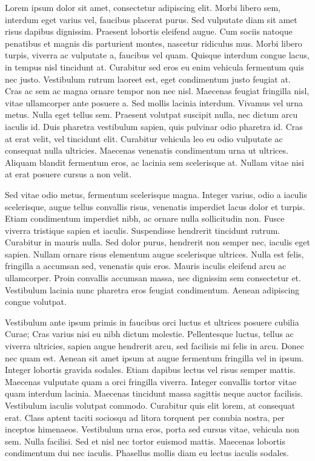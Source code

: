 \documentclass{book}
\begin{document}
Lorem ipsum dolor sit amet, consectetur adipiscing elit. Morbi libero sem,
interdum eget varius vel, faucibus placerat purus. Sed vulputate diam sit amet
risus dapibus dignissim. Praesent lobortis eleifend augue. Cum sociis natoque
penatibus et magnis dis parturient montes, nascetur ridiculus mus. Morbi libero
turpis, viverra ac vulputate a, faucibus vel quam. Quisque interdum congue
lacus, in tempus nisl tincidunt at. Curabitur sed eros eu enim vehicula
fermentum quis nec justo. Vestibulum rutrum laoreet est, eget condimentum justo
feugiat at. Cras ac sem ac magna ornare tempor non nec nisl. Maecenas feugiat
fringilla nisl, vitae ullamcorper ante posuere a. Sed mollis lacinia interdum.
Vivamus vel urna metus. Nulla eget tellus sem. Praesent volutpat suscipit nulla,
nec dictum arcu iaculis id. Duis pharetra vestibulum sapien, quis pulvinar odio
pharetra id. Cras at erat velit, vel tincidunt elit. Curabitur vehicula leo eu
odio vulputate ac consequat nulla ultricies. Maecenas venenatis condimentum
urna ut ultrices. Aliquam blandit fermentum eros, ac lacinia sem scelerisque
at. Nullam vitae nisi at erat posuere cursus a non velit.


Sed vitae odio metus, fermentum scelerisque magna. Integer varius, odio a
iaculis scelerisque, augue tellus convallis risus, venenatis imperdiet lacus
dolor et turpis. Etiam condimentum imperdiet nibh, ac ornare nulla sollicitudin
non. Fusce viverra tristique sapien et iaculis. Suspendisse hendrerit tincidunt
rutrum. Curabitur in mauris nulla. Sed dolor purus, hendrerit non semper nec,
iaculis eget sapien. Nullam ornare risus elementum augue scelerisque ultrices.
Nulla est felis, fringilla a accumsan sed, venenatis quis eros. Mauris iaculis
eleifend arcu ac ullamcorper. Proin convallis accumsan massa, nec dignissim sem
consectetur et. Vestibulum lacinia nunc pharetra eros feugiat condimentum.
Aenean adipiscing congue volutpat.


Vestibulum ante ipsum primis in faucibus orci luctus et ultrices posuere cubilia
Curae; Cras varius nisi eu nibh dictum molestie. Pellentesque luctus, tellus ac
viverra ultricies, sapien augue hendrerit arcu, sed facilisis mi felis in arcu.
Donec nec quam est. Aenean sit amet ipsum at augue fermentum fringilla vel in
ipsum. Integer lobortis gravida sodales. Etiam dapibus lectus vel risus semper
mattis. Maecenas vulputate quam a orci fringilla viverra. Integer convallis
tortor vitae quam interdum lacinia. Maecenas tincidunt massa sagittis neque
auctor facilisis. Vestibulum iaculis volutpat commodo. Curabitur quis elit lorem,
at consequat erat. Class aptent taciti sociosqu ad litora torquent per conubia
nostra, per inceptos himenaeos. Vestibulum urna eros, porta sed cursus vitae,
vehicula non sem. Nulla facilisi. Sed et nisl nec tortor euismod mattis.
Maecenas lobortis condimentum dui nec iaculis. Phasellus mollis diam eu lectus
iaculis sodales.
\end{document}
